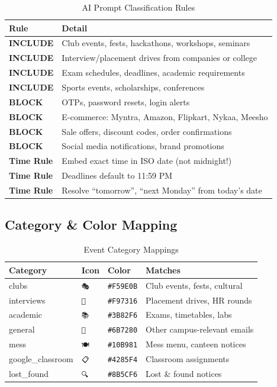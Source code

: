 \documentclass[12pt,a4paper]{report}
\begin{document}
\begin{table}[H]
\centering
{}
\begin{tabularx}{\textwidth}{>{\bfseries}l X}
\rowcolor{tableheadbg}
\color{white}Rule & \color{white}Detail \\
\toprule
INCLUDE          & Club events, fests, hackathons, workshops, seminars \\
INCLUDE          & Interview/placement drives from companies or college \\
INCLUDE          & Exam schedules, deadlines, academic requirements     \\
INCLUDE          & Sports events, scholarships, conferences             \\
BLOCK            & OTPs, password resets, login alerts                 \\
BLOCK            & E-commerce: Myntra, Amazon, Flipkart, Nykaa, Meesho \\
BLOCK            & Sale offers, discount codes, order confirmations     \\
BLOCK            & Social media notifications, brand promotions         \\
Time Rule        & Embed exact time in ISO date (not midnight!)         \\
Time Rule        & Deadlines default to 11:59 PM                       \\
Time Rule        & Resolve ``tomorrow'', ``next Monday'' from today's date \\
\bottomrule
\end{tabularx}
\caption{AI Prompt Classification Rules}
\end{table}

\subsection{Category \& Color Mapping}

\begin{table}[H]
\centering
{}
\begin{tabularx}{\textwidth}{l l l X}
\rowcolor{tableheadbg}
\color{white}Category & \color{white}Icon & \color{white}Color & \color{white}Matches \\
\toprule
clubs          & \texttt{🎭} & \texttt{\#F59E0B} & Club events, fests, cultural \\
interviews     & \texttt{💼} & \texttt{\#F97316} & Placement drives, HR rounds  \\
academic       & \texttt{📚} & \texttt{\#3B82F6} & Exams, timetables, labs      \\
general        & \texttt{📢} & \texttt{\#6B7280} & Other campus-relevant emails \\
mess           & \texttt{🍽}  & \texttt{\#10B981} & Mess menu, canteen notices   \\
google\_classroom & \texttt{📋} & \texttt{\#4285F4} & Classroom assignments        \\
lost\_found    & \texttt{🔍} & \texttt{\#8B5CF6} & Lost \& found notices        \\
\bottomrule
\end{tabularx}
\caption{Event Category Mappings}
\end{table}
\end{document}
